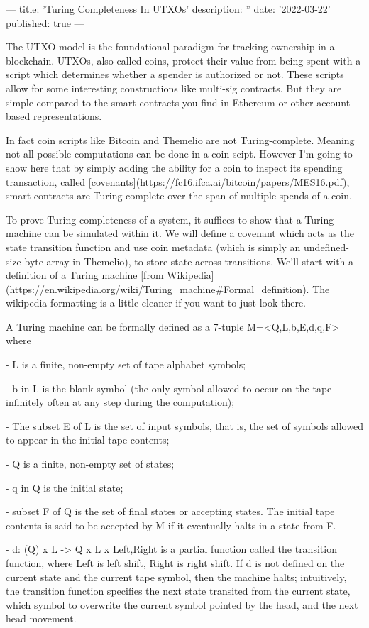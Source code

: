 ---
title: 'Turing Completeness In UTXOs'
description: ''
date: '2022-03-22'
published: true
---

The UTXO model is the foundational paradigm for tracking ownership in a blockchain. UTXOs, also called coins, protect their value from being spent with a script which determines whether a spender is authorized or not. These scripts allow for some interesting constructions like multi-sig contracts. But they are simple compared to the smart contracts you find in Ethereum or other account-based representations.

In fact coin scripts like Bitcoin and Themelio are not Turing-complete. Meaning not all possible computations can be done in a coin scipt. However I'm going to show here that by simply adding the ability for a coin to inspect its spending transaction, called [covenants](https://fc16.ifca.ai/bitcoin/papers/MES16.pdf), smart contracts are Turing-complete over the span of multiple spends of a coin.

To prove Turing-completeness of a system, it suffices to show that a Turing machine can be simulated within it. We will define a covenant which acts as the state transition function and use coin metadata (which is simply an undefined-size byte array in Themelio), to store state across transitions. We'll start with a definition of a Turing machine [from Wikipedia](https://en.wikipedia.org/wiki/Turing_machine#Formal_definition). The wikipedia formatting is a little cleaner if you want to just look there.



A Turing machine can be formally defined as a 7-tuple M=<Q,L,b,E,d,q,F> where

- L is a finite, non-empty set of tape alphabet symbols;

- b in L is the blank symbol (the only symbol allowed to occur on the tape infinitely often at any step during the computation);

- The subset E of L is the set of input symbols, that is, the set of symbols allowed to appear in the initial tape contents;

- Q is a finite, non-empty set of states;

- q in Q is the initial state;

- subset F of Q is the set of final states or accepting states. The initial tape contents is said to be accepted by M if it eventually halts in a state from F.

- d: (Q\F) x L -> Q x L x {Left,Right} is a partial function called the transition function, where Left is left shift, Right is right shift. If d is not defined on the current state and the current tape symbol, then the machine halts; intuitively, the transition function specifies the next state transited from the current state, which symbol to overwrite the current symbol pointed by the head, and the next head movement.



